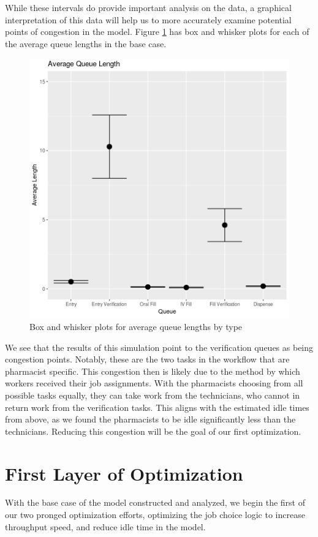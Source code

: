 \documentclass[10pt]{report}            %
\begin{document}
While these intervals do provide important analysis on the data, a graphical interpretation of this data will help us to more accurately examine potential points of congestion in the model. Figure \ref{fig:baseQ} has box and whisker plots for each of the average queue lengths in the base case.
\begin{figure}[H]
\centering
\includegraphics[scale=.5]{BaseQueueCIs.png}
\caption{Box and whisker plots for average queue lengths by type}
\label{fig:baseQ}
\end{figure}
We see that the results of this simulation point to the verification queues as being congestion points. Notably, these are the two tasks in the workflow that are pharmacist specific. This congestion then is likely due to the method by which workers received their job assignments. With the pharmacists choosing from all possible tasks equally, they can take work from the technicians, who cannot in return work from the verification tasks. This aligns with the estimated idle times from above, as we found the pharmacists to be idle significantly less than the technicians. Reducing this congestion will be the goal of our first optimization.
\section*{First Layer of Optimization}
With the base case of the model constructed and analyzed, we begin the first of our two pronged optimization efforts, optimizing the job choice logic to increase throughput speed, and reduce idle time in the model.
\end{document}
